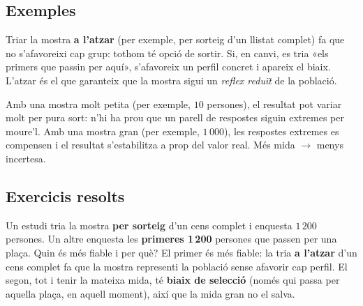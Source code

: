 \begin{center}

\end{center}

\subsection{Exemples}

\begin{exemple}
Triar la mostra \textbf{a l'atzar} (per exemple, per sorteig d'un llistat complet) fa que
no s'afavoreixi cap grup: tothom té opció de sortir. Si, en canvi, es tria «els primers que
passin per aquí», s'afavoreix un perfil concret i apareix el biaix. L'atzar és el que
garanteix que la mostra sigui un \emph{reflex reduït} de la població.
\end{exemple}

\begin{exemple}
Amb una mostra molt petita (per exemple, $10$ persones), el resultat pot variar molt per
pura sort: n'hi ha prou que un parell de respostes siguin extremes per moure'l. Amb una
mostra gran (per exemple, $1\,000$), les respostes extremes es compensen i el resultat
s'estabilitza a prop del valor real. Més mida $\to$ menys incertesa.
\end{exemple}

\subsection{Exercicis resolts}

\begin{exresolt}
Un estudi tria la mostra \textbf{per sorteig} d'un cens complet i enquesta $1\,200$
persones. Un altre enquesta les \textbf{primeres 1\,200} persones que passen per una plaça.
Quin és més fiable i per què?
\solucio
El primer és més fiable: la tria \textbf{a l'atzar} d'un cens complet fa que la mostra
representi la població sense afavorir cap perfil. El segon, tot i tenir la mateixa mida,
té \textbf{biaix de selecció} (només qui passa per aquella plaça, en aquell moment), així
que la mida gran no el salva.
\end{exresolt}

